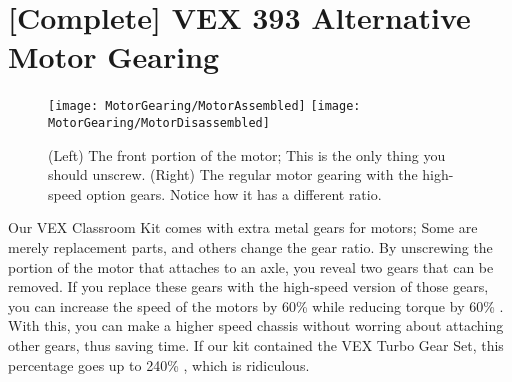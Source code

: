 \section{[Complete] VEX 393 Alternative Motor Gearing}

\begin{figure}[h]
    \centering
    \texttt{[image: MotorGearing/MotorAssembled]}
    \texttt{[image: MotorGearing/MotorDisassembled]}
    \caption{
        (Left) The front portion of the motor; This is the only thing you should unscrew. (Right) The regular motor gearing with the high-speed option gears. Notice how it has a different ratio.
    }
\end{figure}

Our VEX Classroom Kit comes with extra metal gears for motors; Some are merely replacement parts, and others change the gear ratio. By unscrewing the portion of the motor that attaches to an axle, you reveal two gears that can be removed. If you replace these gears with the high-speed version of those gears, you can increase the speed of the motors by 60\% while reducing torque by 60\% \cite{VEXMotor}. With this, you can make a higher speed chassis without worring about attaching other gears, thus saving time. If our kit contained the VEX Turbo Gear Set, this percentage goes up to 240\% \cite{VEXMotor}, which is ridiculous.
